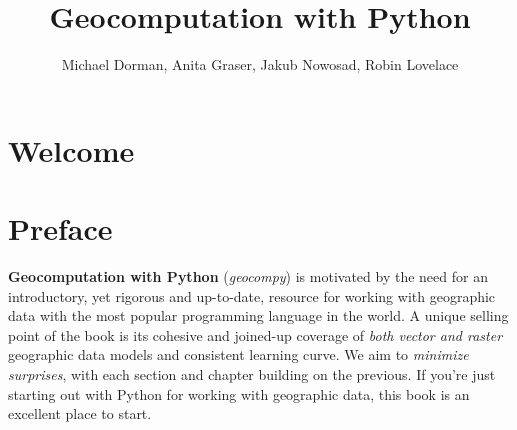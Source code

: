\documentclass[
  letterpaper,
]{krantz}
\title{Geocomputation with Python}
\author{Michael Dorman, Anita Graser, Jakub Nowosad, Robin Lovelace}
\date{}
\renewcommand*\contentsname{Table of contents}
\newcommand\contentsname{Table of contents}
\begin{document}
\maketitle


\thispagestyle{empty}

\vspace*{\fill}

\begin{cjhebrew}
\end{cjhebrew}

\vspace*{2cm}

\vspace*{2cm}

\vspace*{2cm}


\setlength{\abovedisplayskip}{-5pt}
\setlength{\abovedisplayshortskip}{-5pt}

\renewcommand*\contentsname{Table of contents}
{
\hypersetup{linkcolor=}
\setcounter{tocdepth}{2}
\tableofcontents
}

\chapter*{Welcome}\label{welcome}



\chapter*{Preface}\label{preface}


\textbf{Geocomputation with Python} (\emph{geocompy}) is motivated by
the need for an introductory, yet rigorous and up-to-date, resource for
working with geographic data with the most popular programming language
in the world. A unique selling point of the book is its cohesive and
joined-up coverage of \emph{both vector and raster} geographic data
models and consistent learning curve. We aim to \emph{minimize
surprises}, with each section and chapter building on the previous. If
you're just starting out with Python for working with geographic data,
this book is an excellent place to start.
\end{document}
